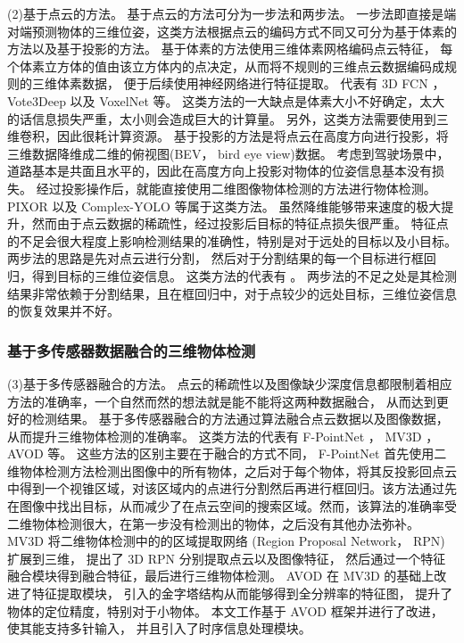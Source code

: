 (2)基于点云的方法。 基于点云的方法可分为一步法和两步法。 一步法即直接是端对端预测物体的三维位姿，这类方法根据点云的编码方式不同又可分为基于体素的方法以及基于投影的方法。 基于体素的方法使用三维体素网格编码点云特征， 每个体素立方体的值由该立方体内的点决定，从而将不规则的三维点云数据编码成规则的三维体素数据， 便于后续使用神经网络进行特征提取。 代表有 3D FCN \cite{li20173d}， Vote3Deep \cite{engelcke2017vote3deep}以及 VoxelNet \cite{zhou2018voxelnet}等。 这类方法的一大缺点是体素大小不好确定，太大的话信息损失严重，太小则会造成巨大的计算量。 另外，这类方法需要使用到三维卷积，因此很耗计算资源。 基于投影的方法是将点云在高度方向进行投影，将三维数据降维成二维的俯视图(BEV， bird eye view)数据。 考虑到驾驶场景中， 道路基本是共面且水平的，因此在高度方向上投影对物体的位姿信息基本没有损失。 经过投影操作后，就能直接使用二维图像物体检测的方法进行物体检测。 PIXOR \cite{yang2018pixor} 以及 Complex-YOLO \cite{simon2018complex,Simon_2019_CVPR_Workshops} 等属于这类方法。 虽然降维能够带来速度的极大提升，然而由于点云数据的稀疏性，经过投影后目标的特征点损失很严重。 特征点的不足会很大程度上影响检测结果的准确性，特别是对于远处的目标以及小目标。 两步法的思路是先对点云进行分割， 然后对于分割结果的每一个目标进行框回归，得到目标的三维位姿信息。 这类方法的代表有 \cite{shi2019pointrcnn}。 两步法的不足之处是其检测结果非常依赖于分割结果，且在框回归中，对于点较少的远处目标，三维位姿信息的恢复效果并不好。

\subsubsection{基于多传感器数据融合的三维物体检测}

(3)基于多传感器融合的方法。 点云的稀疏性以及图像缺少深度信息都限制着相应方法的准确率，一个自然而然的想法就是能不能将这两种数据融合， 从而达到更好的检测结果。 基于多传感器融合的方法通过算法融合点云数据以及图像数据，从而提升三维物体检测的准确率。 这类方法的代表有 F-PointNet \cite{qi2018frustum}， MV3D \cite{chen2017multi}， AVOD \cite{ku2018joint}等。 这些方法的区别主要在于融合的方式不同， F-PointNet 首先使用二维物体检测方法检测出图像中的所有物体，之后对于每个物体，将其反投影回点云中得到一个视锥区域，对该区域内的点进行分割然后再进行框回归。该方法通过先在图像中找出目标，从而减少了在点云空间的搜索区域。然而，该算法的准确率受二维物体检测很大，在第一步没有检测出的物体，之后没有其他办法弥补。 MV3D 将二维物体检测中的的区域提取网络 (Region Proposal Network， RPN) 扩展到三维， 提出了 3D RPN 分别提取点云以及图像特征， 然后通过一个特征融合模块得到融合特征，最后进行三维物体检测。 AVOD 在 MV3D 的基础上改进了特征提取模块， 引入的金字塔结构从而能够得到全分辨率的特征图， 提升了物体的定位精度，特别对于小物体。 本文工作基于 AVOD 框架并进行了改进， 使其能支持多针输入， 并且引入了时序信息处理模块。

